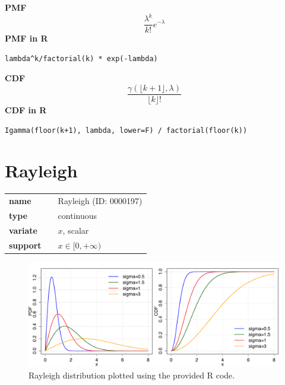 \documentclass{article}
\begin{document}
\smallskip \noindent \hspace{.2cm} \textbf{PMF} 
\begin{equation*}\frac{\lambda^k}{k!}e^{-\lambda}\end{equation*}
\smallskip \noindent \hspace{.2cm} \textbf{PMF in R}  
\begin{verbatim}lambda^k/factorial(k) * exp(-lambda)\end{verbatim}
\smallskip \noindent \hspace{.2cm} \textbf{CDF} 
\begin{equation*}\frac{\gamma(\lfloor k+1 \rfloor,\lambda)}{\lfloor k \rfloor!}\end{equation*}
\smallskip \noindent \hspace{.2cm} \textbf{CDF in R} 
\begin{verbatim}Igamma(floor(k+1), lambda, lower=F) / factorial(floor(k))\end{verbatim}
\smallskip\section*{Rayleigh} 

  \bigskip 

\begin{tabular}{p{2cm}cl}
\textbf{name} & & Rayleigh (ID: 0000197)\\ 
 
\textbf{type} & & continuous \\ 

\textbf{variate} & & $x$, scalar \\ 

\textbf{support} & & $x \in [0,+\infty)$
\end{tabular}

\begin{figure}[ht!]
\centering
  \includegraphics[width=140mm]{pics/Rayleigh.pdf}
 \caption{Rayleigh distribution plotted using the provided R code.}
 \label{fig:Rayleigh}
\end{figure}
\end{document}
